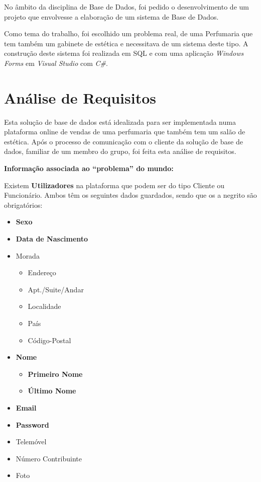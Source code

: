 \documentclass[10pt,portuguese]{article}
\begin{document}
\par No âmbito da disciplina de Base de Dados, foi pedido o desenvolvimento de um projeto que envolvesse a elaboração de um sistema de Base de Dados.

\par Como tema do trabalho, foi escolhido um problema real, de uma Perfumaria que tem também um gabinete de estética e necessitava de um sistema deste tipo. A construção deste sistema foi realizada em SQL e com uma aplicação \textit{Windows Forms} em \textit{Visual Studio} com \textit{C\#}.

\section{Análise de Requisitos}

\par Esta solução de base de dados está idealizada para ser implementada numa plataforma online de vendas de uma perfumaria que também tem um salão de estética. Após o processo de comunicação com o cliente da solução de base de dados, familiar de um membro do grupo, foi feita esta análise de requisitos.

\par \textbf{Informação associada ao “problema” do mundo:}
\par Existem \textbf{Utilizadores} na plataforma que podem ser do tipo Cliente ou Funcionário. Ambos têm os seguintes dados guardados, sendo que os a negrito são obrigatórios:

\begin{itemize}
    \item \textbf{Sexo}
    \item \textbf{Data de Nascimento}
    \item Morada
    \begin{itemize}
        \item Endereço
        \item Apt./Suite/Andar
        \item Localidade
        \item País
        \item Código-Postal
    \end{itemize}
    \item \textbf{Nome}
    \begin{itemize}
        \item \textbf{Primeiro Nome}
        \item \textbf{Último Nome}
     \end{itemize}
     \item \textbf{Email}
     \item \textbf{Password}
     \item Telemóvel
     \item Número Contribuinte
     \item Foto
\end{itemize}
\end{document}
